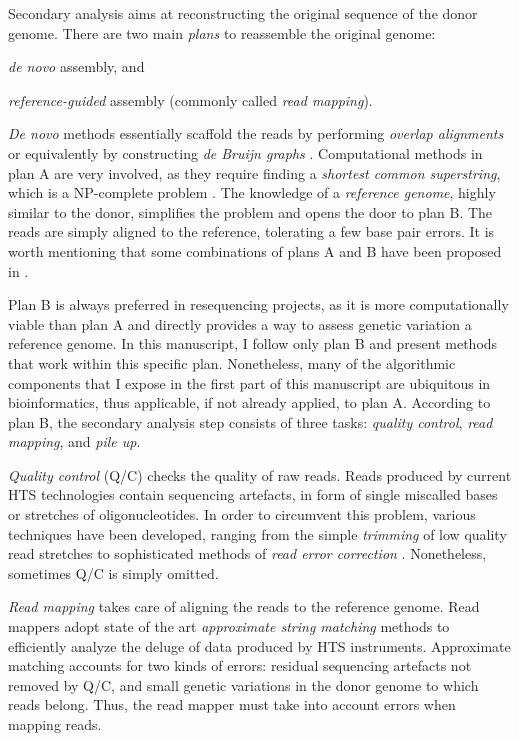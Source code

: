 Secondary analysis aims at reconstructing the original sequence of the donor genome.
There are two main \emph{plans} to reassemble the original genome: \begin{inparaenum}[(A)]
\item \emph{de novo} assembly, and
\item \emph{reference-guided} assembly (commonly called \emph{read mapping}).
\end{inparaenum}
\emph{De novo} methods essentially scaffold the reads by performing \emph{overlap alignments} \citep{?} or equivalently by constructing \emph{de Bruijn graphs} \citep{?}.
Computational methods in plan A are very involved, as they require finding a \emph{shortest common superstring}, which is a NP-complete problem \citep{?}.
The knowledge of a \emph{reference genome}, highly similar to the donor, simplifies the problem and opens the door to plan B.
The reads are simply aligned to the reference, tolerating a few base pair errors.
It is worth mentioning that some combinations of plans A and B have been proposed in \citep{fermi,?}.

Plan B is always preferred in resequencing projects, as it is more computationally viable than plan A and directly provides a way to assess genetic variation \wrt a reference genome.
In this manuscript, I follow only plan B and present methods that work within this specific plan.
Nonetheless, many of the algorithmic components that I expose in the first part of this manuscript are ubiquitous in bioinformatics, thus applicable, if not already applied, to plan A.
According to plan B, the secondary analysis step consists of three tasks: \emph{quality control}, \emph{read mapping}, and \emph{pile up}.

\emph{Quality control} (Q/C) checks the quality of raw reads.
Reads produced by current HTS technologies contain sequencing artefacts, in form of single miscalled bases or stretches of oligonucleotides.
In order to circumvent this problem, various techniques have been developed, ranging from the simple \emph{trimming} of low quality read stretches to sophisticated methods of \emph{read error correction} \citep{fiona}.
Nonetheless, sometimes Q/C is simply omitted.

\emph{Read mapping} takes care of aligning the reads to the reference genome.
Read mappers adopt state of the art \emph{approximate string matching} methods to efficiently analyze the deluge of data produced by HTS instruments.
Approximate matching accounts for two kinds of errors:
residual sequencing artefacts not removed by Q/C, and small genetic variations in the donor genome to which reads belong.
Thus, the read mapper must take into account errors when mapping reads.

